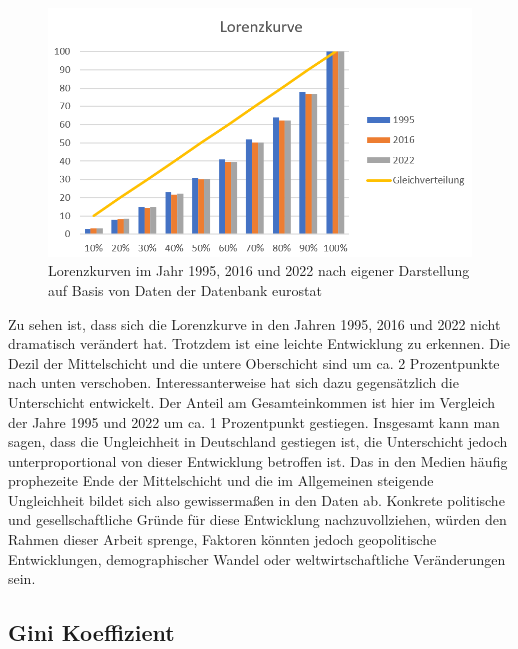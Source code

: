 \documentclass[a4paper,12pt]{article}
\begin{document}
\begin{figure}[h]
\centering
\includegraphics[width=1.0\textwidth]{Lorenzkurve.png}
\caption[short]{Lorenzkurven im Jahr 1995, 2016 und 2022 nach eigener Darstellung auf Basis von Daten der Datenbank eurostat \cite{eurostat_2024}}
\end{figure}


Zu sehen ist, dass sich die Lorenzkurve in den Jahren 1995, 2016 und 2022 nicht dramatisch verändert hat. Trotzdem ist eine leichte Entwicklung zu erkennen.
Die Dezil der Mittelschicht und die untere Oberschicht sind um ca. 2 Prozentpunkte nach unten verschoben. Interessanterweise hat sich dazu gegensätzlich die Unterschicht entwickelt.
Der Anteil am Gesamteinkommen ist hier im Vergleich der Jahre 1995 und 2022 um ca. 1 Prozentpunkt gestiegen. Insgesamt kann man sagen, dass die Ungleichheit in Deutschland gestiegen ist, die Unterschicht jedoch unterproportional
von dieser Entwicklung betroffen ist. Das in den Medien häufig prophezeite Ende der Mittelschicht und die im Allgemeinen steigende Ungleichheit bildet sich also gewissermaßen in den Daten ab. Konkrete politische und gesellschaftliche Gründe für diese Entwicklung nachzuvollziehen, 
würden den Rahmen dieser Arbeit sprenge, Faktoren könnten jedoch geopolitische Entwicklungen, demographischer Wandel oder weltwirtschaftliche Veränderungen sein.

\subsection*{Gini Koeffizient}
\end{document}
